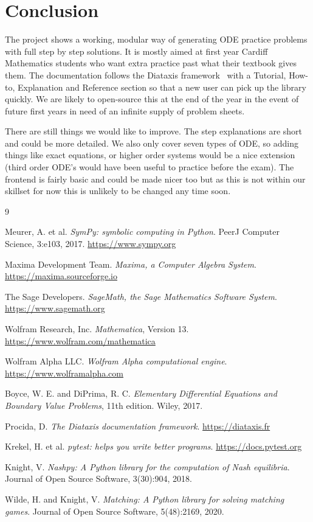 \documentclass{article}
\begin{document}
\section{Conclusion}
The project shows a working, modular way of generating ODE practice problems with full step by step solutions. It is mostly aimed at first year Cardiff Mathematics students who want extra practice past what their textbook gives them. The documentation follows the Diataxis framework~\cite{diataxis} with a Tutorial, How-to, Explanation and Reference section so that a new user can pick up the library quickly. We are likely to open-source this at the end of the year in the event of future first years in need of an infinite supply of problem sheets.

There are still things we would like to improve. The step explanations are short and could be more detailed. We also only cover seven types of ODE, so adding things like exact equations, or higher order systems would be a nice extension (third order ODE's would have been useful to practice before the exam). The frontend is fairly basic and could be made nicer too but as this is not within our skillset for now this is unlikely to be changed any time soon.

\begin{thebibliography}{9}

Meurer, A. et al.
\emph{SymPy: symbolic computing in Python}.
PeerJ Computer Science, 3:e103, 2017.
\url{https://www.sympy.org}

Maxima Development Team.
\emph{Maxima, a Computer Algebra System}.
\url{https://maxima.sourceforge.io}

The Sage Developers.
\emph{SageMath, the Sage Mathematics Software System}.
\url{https://www.sagemath.org}

Wolfram Research, Inc.
\emph{Mathematica}, Version 13.
\url{https://www.wolfram.com/mathematica}

Wolfram Alpha LLC.
\emph{Wolfram Alpha computational engine}.
\url{https://www.wolframalpha.com}

Boyce, W. E. and DiPrima, R. C.
\emph{Elementary Differential Equations and Boundary Value Problems},
11th edition. Wiley, 2017.

Procida, D.
\emph{The Diataxis documentation framework}.
\url{https://diataxis.fr}

Krekel, H. et al.
\emph{pytest: helps you write better programs}.
\url{https://docs.pytest.org}

Knight, V.
\emph{Nashpy: A Python library for the computation of Nash equilibria}.
Journal of Open Source Software, 3(30):904, 2018.

Wilde, H. and Knight, V.
\emph{Matching: A Python library for solving matching games}.
Journal of Open Source Software, 5(48):2169, 2020.

\end{thebibliography}
\end{document}
